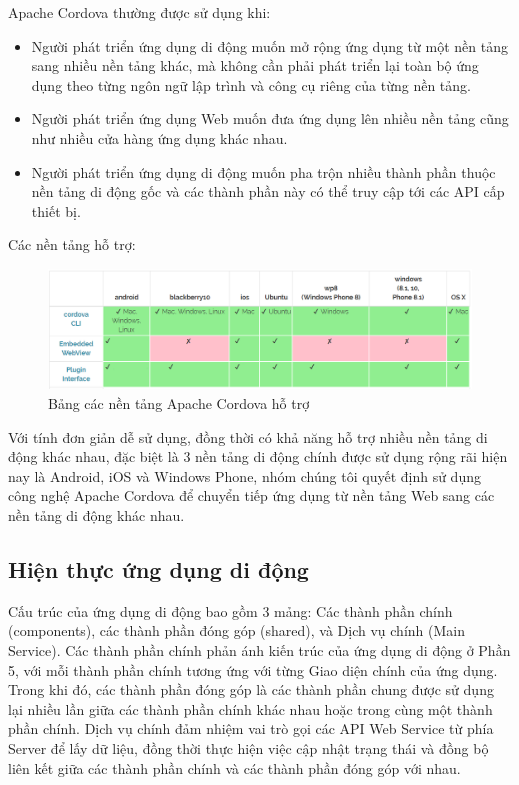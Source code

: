 \documentclass[11pt,a4paper,oneside]{book}
\begin{document}
Apache Cordova thường được sử dụng khi:

\begin{itemize}[topsep=1mm,itemsep=-0.5mm]
\item Người phát triển ứng dụng di động muốn mở rộng ứng dụng từ một nền tảng sang nhiều nền tảng khác, mà không cần phải phát triển lại toàn bộ ứng dụng theo từng ngôn ngữ lập trình và công cụ riêng của từng nền tảng.
\item Người phát triển ứng dụng Web muốn đưa ứng dụng lên nhiều nền tảng cũng như nhiều cửa hàng ứng dụng khác nhau.
\item Người phát triển ứng dụng di động muốn pha trộn nhiều thành phần thuộc nền tảng di động gốc và các thành phần này có thể  truy cập tới các API cấp thiết bị.
\vspace{1mm}
\end{itemize}

Các nền tảng hỗ trợ:

\begin{figure}[h]
  \centering
     \includegraphics[width=15cm]{6-cordova-platforms}
  \caption{Bảng các nền tảng Apache Cordova hỗ trợ}\label{fig:6-cordova-platforms}
\end{figure}

Với tính đơn giản dễ sử dụng, đồng thời có khả năng hỗ trợ nhiều nền tảng di động khác nhau, đặc biệt là 3 nền tảng di động chính được sử dụng rộng rãi hiện nay là Android, iOS và Windows Phone, nhóm chúng tôi quyết định sử dụng công nghệ Apache Cordova để chuyển tiếp ứng dụng từ nền tảng Web sang các nền tảng di động khác nhau.

\subsection{Hiện thực ứng dụng di động}
Cấu trúc của ứng dụng di động bao gồm 3 mảng: Các thành phần chính (components), các thành phần đóng góp (shared), và Dịch vụ chính (Main Service). Các thành phần chính phản ánh kiến trúc của ứng dụng di động ở Phần 5, với mỗi thành phần chính tương ứng với từng Giao diện chính của ứng dụng. Trong khi đó, các thành phần đóng góp là các thành phần chung được sử dụng lại nhiều lần giữa các thành phần chính khác nhau hoặc trong cùng một thành phần chính. Dịch vụ chính đảm nhiệm vai trò gọi các API Web Service từ phía Server để lấy dữ liệu, đồng thời thực hiện việc cập nhật trạng thái và đồng bộ liên kết giữa các thành phần chính và các thành phần đóng góp với nhau.
\end{document}

